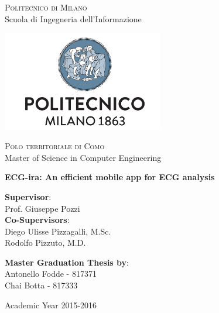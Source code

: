 \thispagestyle{empty}

\begin{center}

	\textsc{Politecnico di Milano}\\
 	Scuola di Ingegneria dell'Informazione\\  

 	\par\vskip 0.2cm

 	\includegraphics[width=7cm]{figures/polimi_logo.png}\\
  
 	\par\vskip 0.2cm  
  
  	\textsc{Polo territoriale di Como}\\
  	Master of Science in Computer Engineering\\  


  	\par\vskip 2cm
  	
\LARGE{ \bf	ECG-ira: An efficient mobile app for ECG analysis}


		
\end{center}

\par\vskip 1.5cm

\begin{flushleft}
\textbf{Supervisor}:\\
Prof. Giuseppe Pozzi\\

\textbf{Co-Supervisors}:\\
Diego Ulisse Pizzagalli, M.Sc.\\
Rodolfo Pizzuto, M.D.
\end{flushleft}

\par\vskip 1cm

\begin{flushleft}
  	\textbf{Master Graduation Thesis by}: \\
  	Antonello Fodde - 817371 \\ 
  	Chai Botta - 817333 \\  
\end{flushleft}

\par\vskip 1cm

\begin{center}
 	Academic Year 2015-2016
\end{center}




